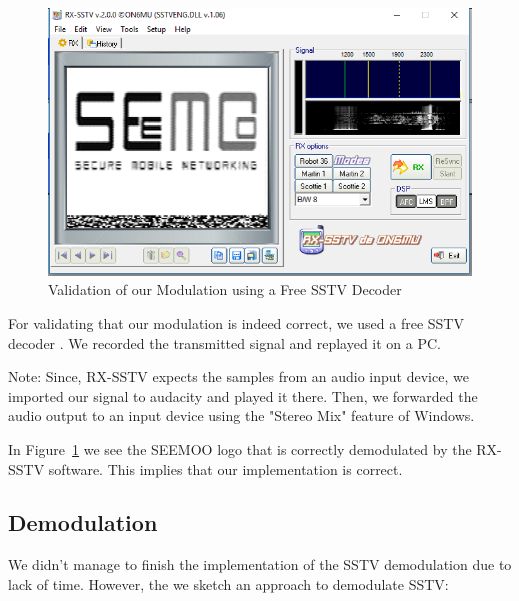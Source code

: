 \begin{figure}
	\centering
	\includegraphics[width=1.0\linewidth]{gfx/screenshot_rxsstv.png}
	\caption{Validation of our Modulation using a Free SSTV Decoder \cite{rxsstv}}
	\label{fig:impl:sstv:rxsstv}
\end{figure}

For validating that our modulation is indeed correct, we used a free SSTV decoder \cite{rxsstv}. We recorded the transmitted signal and replayed it on a PC. 

Note: Since, RX-SSTV expects the samples from an audio input device, we imported our signal to audacity and played it there. Then, we forwarded the audio output to an input device using the "Stereo Mix" feature of Windows.
 
In Figure~\ref{fig:impl:sstv:rxsstv} we see the SEEMOO logo that is correctly demodulated by the RX-SSTV software. This implies that our implementation is correct.


\subsection{Demodulation}
\label{subsubsec:impl:sstv:demod}

We didn't manage to finish the implementation of the SSTV demodulation due to lack of time. However, the we sketch an approach to demodulate SSTV: 

